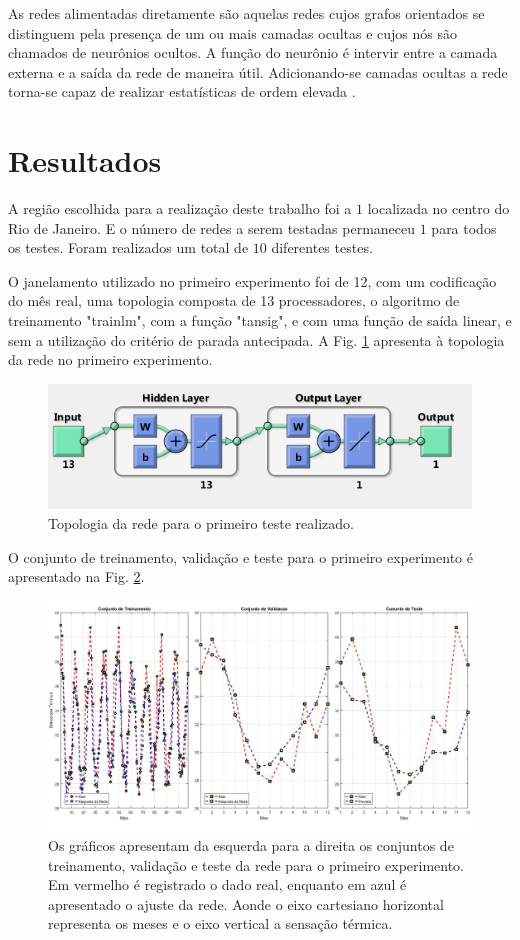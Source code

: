 \documentclass[journal, a4paper]{IEEEtran}
\begin{document}
As redes alimentadas diretamente são aquelas redes cujos grafos orientados se distinguem pela presença de um ou mais camadas ocultas e cujos nós são chamados de neurônios ocultos. A função do neurônio é intervir entre a camada externa e a saída da rede de maneira útil. Adicionando-se camadas ocultas a rede torna-se capaz de realizar estatísticas de ordem elevada \citep{Haykin1999}.


\section{Resultados}
A região escolhida para a realização deste trabalho foi a $1$ localizada no centro do Rio de Janeiro. E o número de redes a serem testadas permaneceu $1$ para todos os testes. Foram realizados um total de $10$ diferentes testes. 

O janelamento utilizado no primeiro experimento foi de 12, com um codificação do mês real, uma topologia composta de 13 processadores, o algoritmo de treinamento "trainlm", com a função "tansig", e com uma função de saída linear, e sem a utilização do critério de parada antecipada. A Fig. \ref{topo1} apresenta à topologia da rede no primeiro experimento. 

\begin{figure}[H]
	\centering
	\includegraphics[scale=0.5]{Images/topologia1.jpg}
	\caption{Topologia da rede para o primeiro teste realizado.}
	\label{topo1}
\end{figure} 


O conjunto de treinamento, validação e teste para o primeiro experimento é apresentado na Fig. \ref{teste1}.

\begin{figure}[H]
	\centering
	\includegraphics[scale=0.15]{Images/Teste1.jpg}
	\caption{Os gráficos apresentam da esquerda para a direita os conjuntos de treinamento, validação e teste da rede para o primeiro experimento. Em vermelho é registrado o dado real, enquanto em azul é apresentado o ajuste da rede. Aonde o eixo cartesiano horizontal representa os meses e o eixo vertical a sensação térmica.}
	\label{teste1}
\end{figure} 
\end{document}
